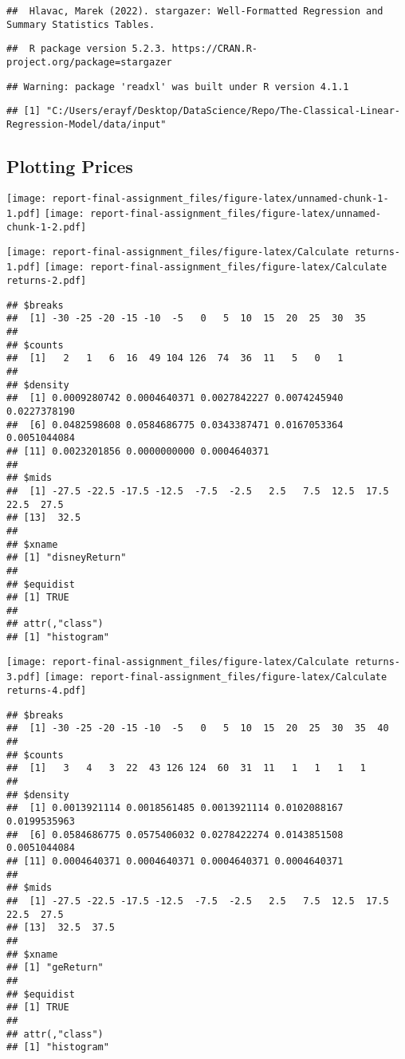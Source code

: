 \documentclass[
]{article}
\begin{document}
\begin{verbatim}
##  Hlavac, Marek (2022). stargazer: Well-Formatted Regression and Summary Statistics Tables.
\end{verbatim}

\begin{verbatim}
##  R package version 5.2.3. https://CRAN.R-project.org/package=stargazer
\end{verbatim}

\begin{verbatim}
## Warning: package 'readxl' was built under R version 4.1.1
\end{verbatim}

\begin{verbatim}
## [1] "C:/Users/erayf/Desktop/DataScience/Repo/The-Classical-Linear-Regression-Model/data/input"
\end{verbatim}

\hypertarget{plotting-prices}{%
\subsection{Plotting Prices}\label{plotting-prices}}

\texttt{[image: report-final-assignment\_files/figure-latex/unnamed-chunk-1-1.pdf]}
\texttt{[image: report-final-assignment\_files/figure-latex/unnamed-chunk-1-2.pdf]}

\texttt{[image: report-final-assignment\_files/figure-latex/Calculate returns-1.pdf]}
\texttt{[image: report-final-assignment\_files/figure-latex/Calculate returns-2.pdf]}

\begin{verbatim}
## $breaks
##  [1] -30 -25 -20 -15 -10  -5   0   5  10  15  20  25  30  35
## 
## $counts
##  [1]   2   1   6  16  49 104 126  74  36  11   5   0   1
## 
## $density
##  [1] 0.0009280742 0.0004640371 0.0027842227 0.0074245940 0.0227378190
##  [6] 0.0482598608 0.0584686775 0.0343387471 0.0167053364 0.0051044084
## [11] 0.0023201856 0.0000000000 0.0004640371
## 
## $mids
##  [1] -27.5 -22.5 -17.5 -12.5  -7.5  -2.5   2.5   7.5  12.5  17.5  22.5  27.5
## [13]  32.5
## 
## $xname
## [1] "disneyReturn"
## 
## $equidist
## [1] TRUE
## 
## attr(,"class")
## [1] "histogram"
\end{verbatim}

\texttt{[image: report-final-assignment\_files/figure-latex/Calculate returns-3.pdf]}
\texttt{[image: report-final-assignment\_files/figure-latex/Calculate returns-4.pdf]}

\begin{verbatim}
## $breaks
##  [1] -30 -25 -20 -15 -10  -5   0   5  10  15  20  25  30  35  40
## 
## $counts
##  [1]   3   4   3  22  43 126 124  60  31  11   1   1   1   1
## 
## $density
##  [1] 0.0013921114 0.0018561485 0.0013921114 0.0102088167 0.0199535963
##  [6] 0.0584686775 0.0575406032 0.0278422274 0.0143851508 0.0051044084
## [11] 0.0004640371 0.0004640371 0.0004640371 0.0004640371
## 
## $mids
##  [1] -27.5 -22.5 -17.5 -12.5  -7.5  -2.5   2.5   7.5  12.5  17.5  22.5  27.5
## [13]  32.5  37.5
## 
## $xname
## [1] "geReturn"
## 
## $equidist
## [1] TRUE
## 
## attr(,"class")
## [1] "histogram"
\end{verbatim}
\end{document}
